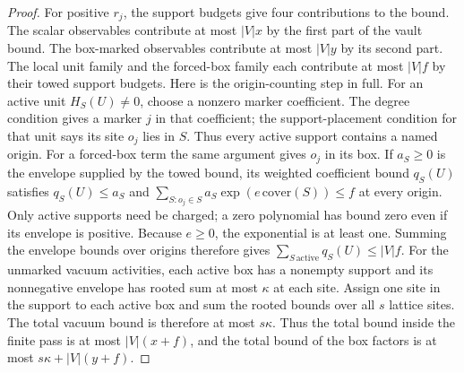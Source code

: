 \begin{proof}
For positive $r_j$, the support budgets give four contributions to the bound. The scalar observables contribute at most $|V|x$ by the first part of the vault bound. The box-marked observables contribute at most $|V|y$ by its second part. The local unit family and the forced-box family each contribute at most $|V|f$ by their towed support budgets. Here is the origin-counting step in full. For an active unit $H_S(U)\neq0$, choose a nonzero marker coefficient. The degree condition gives a marker $j$ in that coefficient; the support-placement condition for that unit says its site $o_j$ lies in $S$. Thus every active support contains a named origin. For a forced-box term the same argument gives $o_j$ in its box. If $a_S\geq0$ is the envelope supplied by the towed bound, its weighted coefficient bound $q_S(U)$ satisfies $q_S(U)\leq a_S$ and $\sum_{S:o_j\in S}a_S\exp(e\,\mathrm{cover}(S))\leq f$ at every origin. Only active supports need be charged; a zero polynomial has bound zero even if its envelope is positive. Because $e\geq0$, the exponential is at least one. Summing the envelope bounds over origins therefore gives $\sum_{S\,\mathrm{active}}q_S(U)\leq |V|f$. For the unmarked vacuum activities, each active box has a nonempty support and its nonnegative envelope has rooted sum at most $\kappa$ at each site. Assign one site in the support to each active box and sum the rooted bounds over all $s$ lattice sites. The total vacuum bound is therefore at most $s\kappa$. Thus the total bound inside the finite pass is at most $|V|(x+f)$, and the total bound of the box factors is at most $s\kappa+|V|(y+f)$.


\end{proof}
